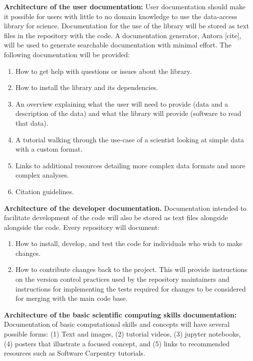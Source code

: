 \textbf{Architecture of the user documentation:} User documentation should make it possible for users with little to no domain knowledge to use the data-access library for science.  Documentation for the use of the library will be stored as text files in the repository with the code.  A documentation generator, Antora [cite], will be used to generate searchable documentation with minimal effort.  The following documentation will be provided:

\begin{enumerate}
    \item How to get help with questions or issues about the library.
    \item How to install the library and its dependencies.
    \item An overview explaining what the user will need to provide (data and a description of the data) and what the library will provide (software to read that data).
    \item A tutorial walking through the use-case of a scientist looking at simple data with a custom format.
    \item Links to additional resources detailing more complex data formats and more complex analyses.
    \item Citation guidelines.  
\end{enumerate}


\textbf{Architecture of the developer documentation.}  Documentation intended to facilitate development of the code will also be stored as text files alongside alongside the code.  Every repository will document:

\begin{enumerate}
    \item How to install, develop, and test the code for individuals who wish to make changes.  
    \item How to contribute changes back to the project.  This will provide instructions on the version control practices used by the repository maintainers and instructions for implementing the tests required for changes to be considered for merging with the main code base.
\end{enumerate}

\textbf{Architecture of the basic scientific computing skills documentation:}  Documentation of basic computational skills and concepts will have several possible forms: (1) Text and images, (2) tutorial videos, (3) jupyter notebooks, (4) posters that illustrate a focused concept, and (5) links to recommended resources such as Software Carpentry tutorials.

